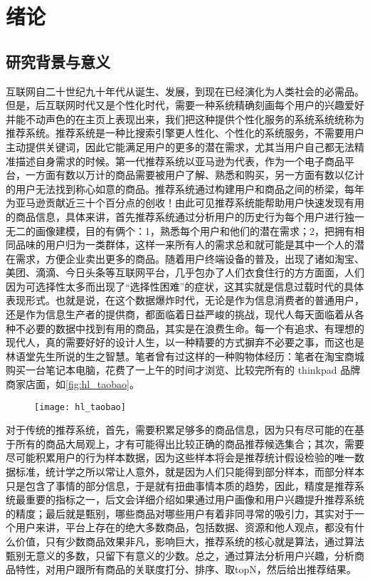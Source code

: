 
\chapter{绪论}
\label{chap:introduction}
\section{研究背景与意义}
	互联网自二十世纪九十年代从诞生、发展，到现在已经演化为人类社会的必需品。但是，后互联网时代又是个性化时代\citep{Personalization1}，需要一种系统精确刻画每个用户的兴趣爱好并能不动声色的在主页上表现出来，我们把这种提供个性化服务的系统系统统称为推荐系统。推荐系统是一种比搜索引擎更人性化、个性化的系统服务，不需要用户主动提供关键词，因此它能满足用户的更多的潜在需求，尤其当用户自己都无法精准描述自身需求的时候\citep{recmd-system}。第一代推荐系统以亚马逊为代表，作为一个电子商品平台，一方面有数以万计的商品需要被用户了解、熟悉和购买，另一方面有数以亿计的用户无法找到称心如意的商品。推荐系统通过构建用户和商品之间的桥梁，每年为亚马逊贡献近三十个百分点的创收！由此可见推荐系统能帮助用户快速发现有用的商品信息，具体来讲，首先推荐系统通过分析用户的历史行为每个用户进行独一无二的画像建模\citep{demo-data}，目的有俩个：1，熟悉每个用户和他们的潜在需求；2，把拥有相同品味的用户归为一类群体，这样一来所有人的需求总和就可能是其中一个人的潜在需求，方便企业卖出更多的商品。随着用户终端设备的普及，出现了诸如淘宝、美团、滴滴、今日头条等互联网平台，几乎包办了人们衣食住行的方方面面，人们因为可选择性太多而出现了“选择性困难”的症状，这其实就是信息过载时代的具体表现形式。也就是说，在这个数据爆炸时代，无论是作为信息消费者的普通用户，还是作为信息生产者的提供商，都面临着日益严峻的挑战，现代人每天面临着从各种不必要的数据中找到有用的商品，其实是在浪费生命。每一个有追求、有理想的现代人，真的需要好好的设计人生，以一种精要的方式摒弃不必要之事，而这也是林语堂先生所说的生之智慧。笔者曾有过这样的一种购物体经历：笔者在淘宝商城购买一台笔记本电脑，花费了一上午的时间才浏览、比较完所有的 thinkpad 品牌商家店面，如\autoref{fig:hl_taobao}。
	\begin{figure}
		\centering
		\texttt{[image: hl\_taobao]}
		\label{fig:hl_taobao}
	\end{figure}
	对于传统的推荐系统，首先，需要积累足够多的商品信息，因为只有尽可能的在基于所有的商品大局观上，才有可能得出比较正确的商品推荐候选集合；其次，需要尽可能积累用户的行为样本数据，因为这些样本将会是推荐统计假设检验的唯一数据标准，统计学之所以常让人意外，就是因为人们只能得到部分样本，而部分样本只是包含了事情的部分信息，于是就有扭曲事情本质的趋势，因此，精度是推荐系统最重要的指标之一，后文会详细介绍如果通过用户画像和用户兴趣提升推荐系统的精度；最后就是甄别，哪些商品对哪些用户有着非同寻常的吸引力，其实对于一个用户来讲，平台上存在的绝大多数商品，包括数据、资源和他人观点，都没有什么价值，只有少数商品效果非凡，影响巨大，推荐系统的核心就是算法\citep{date-mining}，通过算法甄别无意义的多数，只留下有意义的少数。总之，通过算法分析用户兴趣，分析商品特性，对用户跟所有商品的关联度打分、排序、取topN，然后给出推荐结果。

